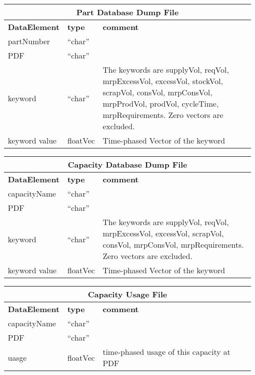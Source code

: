\vspace{.5in}

\begin{tabular}{llp{4in}}
\multicolumn{3}{c}{{\bf Part Database Dump File}}\\ \hline\hline
{\bf DataElement} &  {\bf type}  &   {\bf comment} \\ \hline
partNumber & ``char''  \\
PDF & ``char''  \\
keyword & ``char''  & The keywords are supplyVol, reqVol, mrpExcessVol, excessVol,
   stockVol, scrapVol, consVol, mrpConsVol, mrpProdVol, prodVol, cycleTime,
   mrpRequirements.
   Zero vectors are excluded.\\
keyword value  & floatVec &  Time-phased Vector of the keyword \\
\end{tabular}

\vspace{.5in}

\begin{tabular}{llp{4in}}
\multicolumn{3}{c}{{\bf Capacity Database Dump File}}\\ \hline\hline
{\bf DataElement} &  {\bf type}  &   {\bf comment} \\ \hline
capacityName & ``char''  \\
PDF & ``char''  \\
keyword & ``char''  & The keywords are supplyVol, reqVol, mrpExcessVol, excessVol,
   scrapVol, consVol, mrpConsVol, mrpRequirements.
   Zero vectors are excluded.\\
keyword value  & floatVec &  Time-phased Vector of the keyword \\
\end{tabular}

\vspace{.5in}

\begin{tabular}{llp{4in}}
\multicolumn{3}{c}{{\bf Capacity Usage File}}\\ \hline\hline
{\bf DataElement} &  {\bf type}  &   {\bf comment} \\ \hline
capacityName &  ``char''     \\ 
PDF   & ``char''  \\
uasge          & floatVec &  time-phased usage of this capacity at PDF\\
\end{tabular}

\vspace{.5in}

